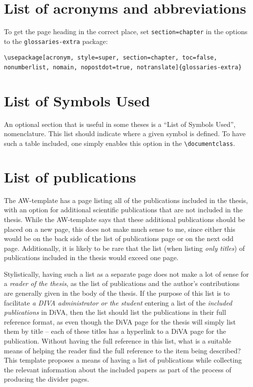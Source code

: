 \documentclass[12pt, twoside]{article}
\begin{document}
\section{List of acronyms and abbreviations}
To get the page heading in the correct place, set \texttt{section=chapter} in the options to the \texttt{glossaries-extra} package:
\begin{lstlisting}[style=latexExampleForAuthors]
\usepackage[acronym, style=super, section=chapter, toc=false, nonumberlist, nomain, nopostdot=true, notranslate]{glossaries-extra}\end{lstlisting}

\section{List of Symbols Used}

An optional section that is useful in some theses is a ``List of Symbols Used'', \ie nomenclature. This list should indicate where a given symbol is defined. To have such a table included, one simply enables this option in the \texttt{\textbackslash documentclass}.

\section{List of publications}
\label{sec:cycle3ListOfPublications}

The AW-template has a page listing all of the publications included in the thesis, with an option for additional scientific publications that are not included in the thesis. While the AW-template says that these additional publications should be placed on a new page, this does not make much sense to me, since either this would be on the back side of the list of publications page or on the next odd page. Additionally, it is likely to be rare that the list (when listing \textit{only titles}) of publications included in the thesis would exceed one page.

Stylistically, having such a list as a separate page does not make a lot of sense for a \textit{reader of the thesis}, as the list of publications and the author's contributions are generally given in the body of the thesis. If the purpose of this list is to facilitate \textit{a DIVA administrator or the student} entering a list of the \textit{included publications} in DiVA, then the list should list the publications in their full reference format, as even though the DiVA page for the thesis will simply list them by title -- each of these titles has a hyperlink to a DiVA page for the publication. Without having the full reference in this list, what is a suitable means of helping the reader find the full reference to the item being described? This template proposes a means of having a list of publications while collecting the relevant information about the included papers as part of the process of producing the divider pages.
\end{document}
